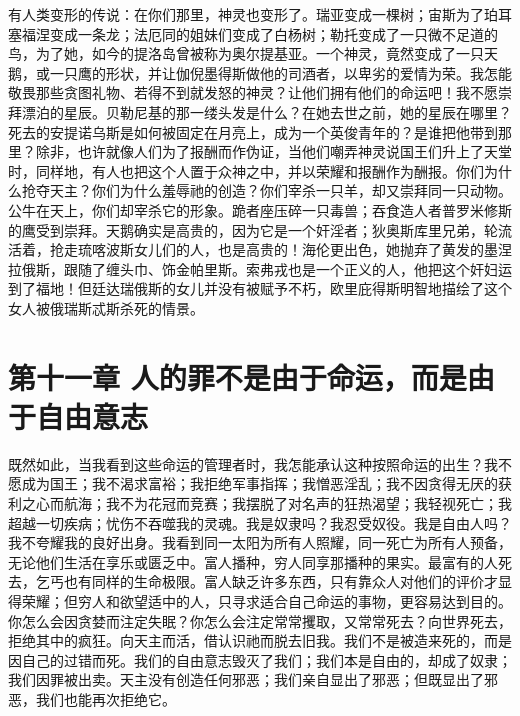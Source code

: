 有人类变形的传说：在你们那里，神灵也变形了。瑞亚变成一棵树；宙斯为了珀耳塞福涅变成一条龙；法厄同的姐妹们变成了白杨树；勒托变成了一只微不足道的鸟，为了她，如今的提洛岛曾被称为奥尔提基亚。一个神灵，竟然变成了一只天鹅，或一只鹰的形状，并让伽倪墨得斯做他的司酒者，以卑劣的爱情为荣。我怎能敬畏那些贪图礼物、若得不到就发怒的神灵？让他们拥有他们的命运吧！我不愿崇拜漂泊的星辰。贝勒尼基的那一缕头发是什么？在她去世之前，她的星辰在哪里？死去的安提诺乌斯是如何被固定在月亮上，成为一个英俊青年的？是谁把他带到那里？除非，也许就像人们为了报酬而作伪证，当他们嘲弄神灵说国王们升上了天堂时，同样地，有人也把这个人置于众神之中，并以荣耀和报酬作为酬报。你们为什么抢夺天主？你们为什么羞辱祂的创造？你们宰杀一只羊，却又崇拜同一只动物。公牛在天上，你们却宰杀它的形象。跪者座压碎一只毒兽；吞食造人者普罗米修斯的鹰受到崇拜。天鹅确实是高贵的，因为它是一个奸淫者；狄奥斯库里兄弟，轮流活着，抢走琉喀波斯女儿们的人，也是高贵的！海伦更出色，她抛弃了黄发的墨涅拉俄斯，跟随了缠头巾、饰金帕里斯。索弗戎也是一个正义的人，他把这个奸妇运到了福地！但廷达瑞俄斯的女儿并没有被赋予不朽，欧里庇得斯明智地描绘了这个女人被俄瑞斯忒斯杀死的情景。\par


\section{第十一章 人的罪不是由于命运，而是由于自由意志}

既然如此，当我看到这些命运的管理者时，我怎能承认这种按照命运的出生？我不愿成为国王；我不渴求富裕；我拒绝军事指挥；我憎恶淫乱；我不因贪得无厌的获利之心而航海；我不为花冠而竞赛；我摆脱了对名声的狂热渴望；我轻视死亡；我超越一切疾病；忧伤不吞噬我的灵魂。我是奴隶吗？我忍受奴役。我是自由人吗？我不夸耀我的良好出身。我看到同一太阳为所有人照耀，同一死亡为所有人预备，无论他们生活在享乐或匮乏中。富人播种，穷人同享那播种的果实。最富有的人死去，乞丐也有同样的生命极限。富人缺乏许多东西，只有靠众人对他们的评价才显得荣耀；但穷人和欲望适中的人，只寻求适合自己命运的事物，更容易达到目的。你怎么会因贪婪而注定失眠？你怎么会注定常常攫取，又常常死去？向世界死去，拒绝其中的疯狂。向天主而活，借认识祂而脱去旧我。我们不是被造来死的，而是因自己的过错而死。我们的自由意志毁灭了我们；我们本是自由的，却成了奴隶；我们因罪被出卖。天主没有创造任何邪恶；我们亲自显出了邪恶；但既显出了邪恶，我们也能再次拒绝它。\par


